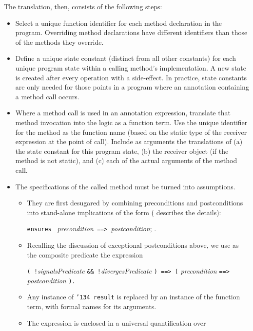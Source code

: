 \documentclass{sig-alternate2}
\begin{document}
The translation, then, consists of the following steps:
\setlength{\partopsep}{0in}\setlength{\parskip}{0in}\setlength{\itemsep}{0in}\setlength{\topsep}{0in}
\begin{itemize}
\setlength{\partopsep}{0in}\setlength{\parskip}{0in}\setlength{\itemsep}{0in}\setlength{\topsep}{0in}
\item Select a unique function identifier for each method declaration 
in the program.  Overriding method declarations have different identifiers than those of the
methods they override.
\item Define a unique state constant (distinct from all other constants) for each unique program
state within a calling method's implementation. 
 A new state is created after every operation with a side-effect.  
In
practice, state constants are only needed for those points in a program where an annotation 
containing a method call occurs.  
\item Where a method call is used in an annotation expression, translate that method invocation
into the logic as a function term.  Use the unique identifier for the 
method as the function name (based on the static type of the receiver expression at the point of
call).  Include as arguments the translations of (a) the
state constant for this  program state, (b) the receiver object (if the method is not static),
and (c) each of the actual arguments of the method call.  
\item The specifications of the called method must be turned into assumptions.  
\begin{itemize}
\item They 
are first desugared by combining preconditions and postconditions
into stand-alone implications of the form (\cite{Raghavan-Leavens03} describes the details):
\begin{center} \texttt{ensures } {\em precondition}\texttt{ ==> }{\em postcondition}; .\end{center}
\item Recalling the discussion of exceptional postconditions above, we use as the composite predicate
the expression
\begin{center}{\tt ( !}{\em signalsPredicate} {\tt \&\& !}{\em divergesPredicate} {\tt ) ==> (} {\em precondition} {\tt ==>} {\em postcondition} \tt{)}.\end{center}
\item Any instance of \texttt{\char'134 result} is replaced by an instance of the function term, with
formal names for its arguments.  
\item The expression is enclosed in a universal quantification over

\end{itemize}
\end{itemize}
\end{document}
